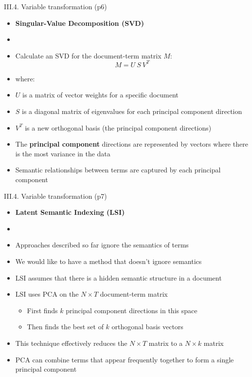 \documentclass[handout]{beamer}
\newcommand{\strong}[1]{\textbf{\color{teal} #1}}
\newcommand{\stronger}[1]{\textbf{\color{purple} #1}}
\begin{document}
\begin{frame}{III.4. Variable transformation (p6)}
\begin{itemize}
\item[] \stronger{Singular-Value Decomposition (SVD)}
\item[]
\item Calculate an SVD for the document-term matrix $M$:
\[
	M = U ~ S ~ V^T
\]
\item[] where:
\item[] $U$ is a matrix of vector weights for a specific document
\item[] $S$ is a diagonal matrix of eigenvalues for each principal component direction
\item[] $V^T$ is a new orthogonal basis (the principal component directions)
\item The \strong{principal component} directions are represented by vectors where there is the most variance in the data
\item Semantic relationships between terms are captured by each principal component
\end{itemize}
\end{frame}
\begin{frame}{III.4. Variable transformation (p7)}
\begin{itemize}
\item[] \stronger{Latent Semantic Indexing (LSI)}
\item[]
\item Approaches described so far ignore the semantics of terms
\item We would like to have a method that doesn't ignore semantics
\item LSI assumes that there is a hidden semantic structure in a document
\item LSI uses PCA on the $N \times T$ document-term matrix
	\begin{itemize}
	\item First finds $k$ principal component directions in this space
	\item Then finds the best set of $k$ orthogonal basis vectors
	\end{itemize}
\item This technique effectively reduces the $N \times T$ matrix to a $N \times k$ matrix
\item PCA can combine terms that appear frequently together to form a single principal component
\end{itemize}
\end{frame}
\end{document}
